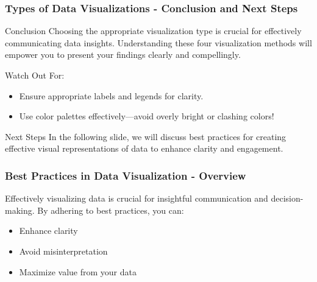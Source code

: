 \documentclass[aspectratio=169]{beamer}
\begin{document}
\begin{frame}[fragile]
    \frametitle{Types of Data Visualizations - Conclusion and Next Steps}
    \begin{block}{Conclusion}
        Choosing the appropriate visualization type is crucial for effectively communicating data insights.
        Understanding these four visualization methods will empower you to present your findings clearly and compellingly.
    \end{block}
    
    \begin{block}{Watch Out For:}
        \begin{itemize}
            \item Ensure appropriate labels and legends for clarity.
            \item Use color palettes effectively—avoid overly bright or clashing colors!
        \end{itemize}
    \end{block}

    \begin{block}{Next Steps}
        In the following slide, we will discuss best practices for creating effective visual representations of data to enhance clarity and engagement.
    \end{block}
\end{frame}

\begin{frame}[fragile]
    \frametitle{Best Practices in Data Visualization - Overview}
    Effectively visualizing data is crucial for insightful communication and decision-making. By adhering to best practices, you can:
    \begin{itemize}
        \item Enhance clarity
        \item Avoid misinterpretation
        \item Maximize value from your data
    \end{itemize}
\end{frame}
\end{document}
